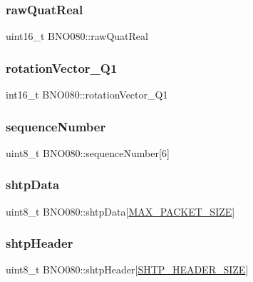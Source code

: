 \subsubsection{\texorpdfstring{rawQuatReal}{rawQuatReal}}
{\footnotesize\ttfamily uint16\+\_\+t B\+N\+O080\+::raw\+Quat\+Real\hspace{0.3cm}{\ttfamily [private]}}

\mbox{\label{classBNO080_a544161adfb515e0691064c13b34ea5cf}} 
\subsubsection{\texorpdfstring{rotationVector\_Q1}{rotationVector\_Q1}}
{\footnotesize\ttfamily int16\+\_\+t B\+N\+O080\+::rotation\+Vector\+\_\+\+Q1\hspace{0.3cm}{\ttfamily [private]}}

\mbox{\label{classBNO080_affdd3ab68081775957bcc48f51cb0a22}} 
\subsubsection{\texorpdfstring{sequenceNumber}{sequenceNumber}}
{\footnotesize\ttfamily uint8\+\_\+t B\+N\+O080\+::sequence\+Number\mbox{[}6\mbox{]}}

\mbox{\label{classBNO080_a1dc1f807ca4810d927a4ce9fcaec45ab}} 
\subsubsection{\texorpdfstring{shtpData}{shtpData}}
{\footnotesize\ttfamily uint8\+\_\+t B\+N\+O080\+::shtp\+Data\mbox{[}\mbox{\hyperlink{BNO080__Xmega__Lib_8h_a879456c3b8e2853f7044d764e9c180d4}{M\+A\+X\+\_\+\+P\+A\+C\+K\+E\+T\+\_\+\+S\+I\+ZE}}\mbox{]}}

\mbox{\label{classBNO080_a61af3bfce34b10950631803443273fcf}} 
\subsubsection{\texorpdfstring{shtpHeader}{shtpHeader}}
{\footnotesize\ttfamily uint8\+\_\+t B\+N\+O080\+::shtp\+Header\mbox{[}\mbox{\hyperlink{BNO080__Xmega__Lib_8h_aa80b64798e7ac4c96fe314006a5b99e9}{S\+H\+T\+P\+\_\+\+H\+E\+A\+D\+E\+R\+\_\+\+S\+I\+ZE}}\mbox{]}}



